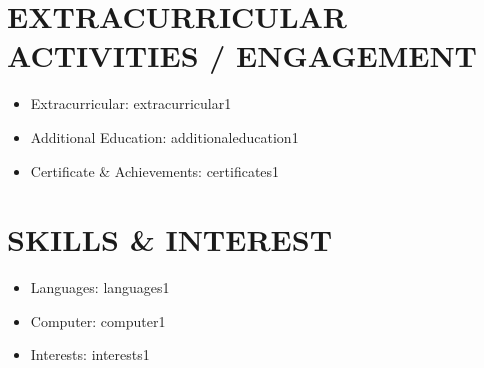 \documentclass[a4paper,8pt]{article}
\begin{document}
\section{EXTRACURRICULAR ACTIVITIES / ENGAGEMENT}
\begin{itemize}[label={\large\textbullet}, left=0pt, itemsep=0.5ex, parsep=0.5ex]
    \item Extracurricular: extracurricular1
    \item Additional Education: additionaleducation1
    \item Certificate \& Achievements: certificates1
\end{itemize}

\section{SKILLS \& INTEREST}
\begin{itemize}[label={\large\textbullet}, left=0pt, itemsep=0.5ex, parsep=0.5ex]
    \item Languages: languages1
    \item Computer: computer1
    \item Interests: interests1
\end{itemize}
\end{document}
